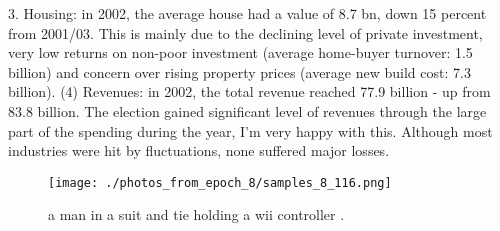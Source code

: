 \documentclass{article}%
\begin{document}
3. Housing: in 2002, the average house had a value of 8.7 bn, down 15 percent from 2001/03. This is mainly due to the declining level of private investment, very low returns on non{-}poor investment (average home{-}buyer turnover: 1.5 billion) and concern over rising property prices (average new build cost: 7.3 billion).\newline%
(4) Revenues: in 2002, the total revenue reached 77.9 billion {-} up from 83.8 billion. The election gained significant level of revenues through the large part of the spending during the year, I’m very happy with this. Although most industries were hit by fluctuations, none suffered major losses.\newline%

%


\begin{figure}[h!]%
\centering%
\texttt{[image: ./photos\_from\_epoch\_8/samples\_8\_116.png]}%
\caption{a man in a suit and tie holding a wii controller .}%
\end{figure}

%
\end{document}
